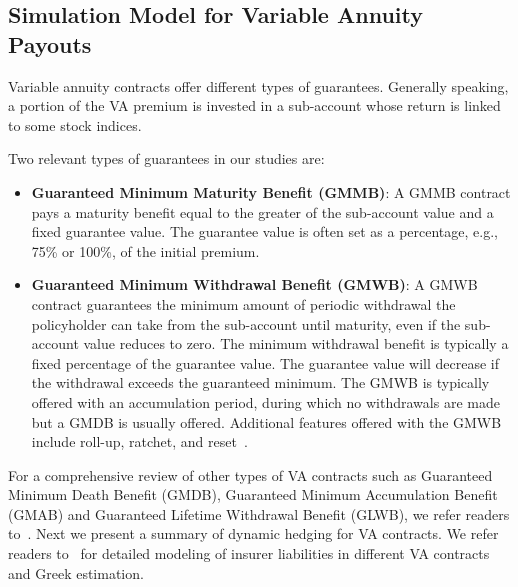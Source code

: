 \subsection{Simulation Model for Variable Annuity Payouts}\label{subsec:VApayout}

Variable annuity contracts offer different types of guarantees.
Generally speaking, a portion of the VA premium is invested in a sub-account whose return is linked to some stock indices.

Two relevant types of guarantees in our studies are:
\begin{itemize}[noitemsep]
    \item \textbf{Guaranteed Minimum Maturity Benefit (GMMB)}: A GMMB contract pays a maturity benefit equal to the greater of the sub-account value and a fixed guarantee value.
    The guarantee value is often set as a percentage, e.g., 75\% or 100\%, of the initial premium.

    \item \textbf{Guaranteed Minimum Withdrawal Benefit (GMWB)}: A GMWB contract guarantees the minimum amount of periodic withdrawal the policyholder can take from the sub-account until maturity, even if the sub-account value reduces to zero.
    The minimum withdrawal benefit is typically a fixed percentage of the guarantee value.
    The guarantee value will decrease if the withdrawal exceeds the guaranteed minimum. The GMWB is typically offered with an accumulation period, during which no withdrawals are made but a GMDB is usually offered. Additional features offered with the GMWB include roll-up, ratchet, and reset~\citep{geneva2013variable}.
\end{itemize}
For a comprehensive review of other types of VA contracts such as Guaranteed Minimum Death Benefit (GMDB), Guaranteed Minimum Accumulation Benefit (GMAB) and Guaranteed Lifetime Withdrawal Benefit (GLWB), we refer readers to~\cite{hardy2003investment}.
Next we present a summary of dynamic hedging for VA contracts.
We refer readers to~\cite{dang2021efficient} for detailed modeling of insurer liabilities in different VA contracts and Greek estimation.

